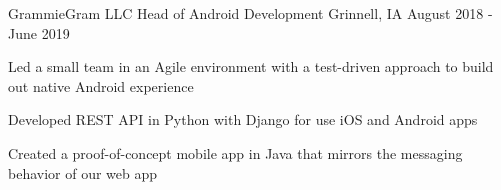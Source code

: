 \documentclass[11pt, a4paper]{awesome-cv}
\begin{document}
\begin{cventries}
  \cventry
    {GrammieGram LLC}
    {Head of Android Development}
    {Grinnell, IA}
    {August 2018 - June 2019}
    {
      \begin{cvitems}
        \item {Led a small team in an Agile environment with a test-driven approach to build out native Android experience}
      	\item {Developed REST API in Python with Django for use iOS and Android apps}
	      \item {Created a proof-of-concept mobile app in Java that mirrors the messaging behavior of our web app}
      \end{cvitems}
    }







\end{cventries}
\end{document}
